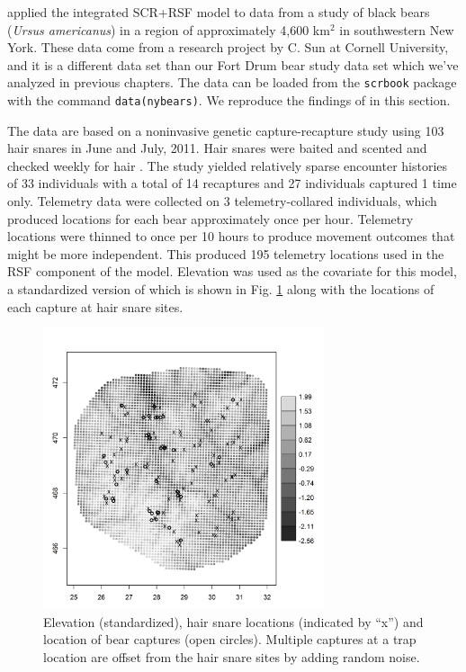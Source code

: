 \citet{royle_etal:2012mee} applied the integrated SCR+RSF model to
data from a study of black bears ({\it Ursus americanus})
in a region of approximately 4,600
km$^2$ in southwestern New York.  These data come from a research
project by C. Sun \citep{sun:2013} at Cornell University, and it is a 
different data set than our Fort Drum bear study data set which we've analyzed
in previous chapters.  The data can be loaded from the \mbox{\tt scrbook}
package with the command \mbox{\tt data(nybears)}.
We reproduce the findings of \citet{royle_etal:2012mee} in this section.

The data are based on a noninvasive genetic capture-recapture study
using 103 hair snares in June and July, 2011.  Hair snares were baited
and scented and checked weekly for hair \citep{sun:2013}.  The study
yielded relatively sparse encounter histories
 of 33 individuals with a total of 14 recaptures and 27
individuals captured 1 time only.
Telemetry data were collected on 3 telemetry-collared individuals, which produced
locations for each bear approximately once per hour.  Telemetry
locations were 
thinned to once per 10 hours to produce movement outcomes that might
be more independent. This produced 195 telemetry locations used in the
RSF component of the model.  Elevation was used as the covariate for this 
model, a standardized version of which is shown in
Fig. \ref{fig.elevation} along with the locations of each
capture at hair snare sites.  


\begin{figure}[ht]
\centering
\includegraphics[width=3.25in,height=3.25in]{Ch13-RSF/figs/elev_captures_bw.png}
\caption{
Elevation (standardized), hair snare locations (indicated by ``x'') and location
of bear captures (open circles).
Multiple captures at a trap location are offset from the hair snare
sites by adding
random noise.
}
\label{fig.elevation}
\end{figure}


